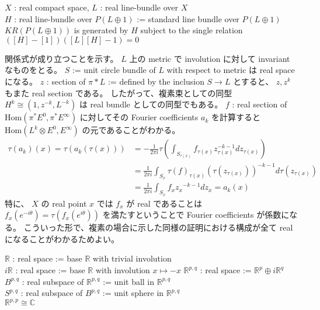 \documentclass[dvipdfmx]{jsarticle}
\begin{document}
\begin{Theorem}
\itemprop
  \For \(X\) : real compact space, \(L\) : real line-bundle over \(X\) \\
  \Let \(H\) : real line-bundle over \(P(L \oplus 1)\) := standard line bundle over \(P(L \oplus 1)\) \\
  \Then \(KR(P(L \oplus 1))\) is generated by \(H\) subject to the single relation \(([H] - [1])([L][H] - 1) = 0\)
\end{Theorem}

\begin{Proof}
\itemprof
  関係式が成り立つことを示す。
  \(L\) 上の metric で involution に対して invariant なものをとる。
  \(S\) := unit circle bundle of \(L\) with respect to metric は real space になる。
  \(z\) : section of \(\pi*L\) := defined by the inclusion \(S \to L\) とすると、 \(z, z^k\) もまた real section である。
  したがって、複素束としての同型 \(H^k \cong (1, z^{-k}, L^{-k})\) は real bundle としての同型でもある。
\itemthen
  \(f\) : real section of \(\text{Hom}(\pi^*{E^0}, \pi^*{E^\infty})\) に対してその Fourier coefficients \(a_{k}\) を計算すると \(\text{Hom}(L^{k} \otimes E^0, E^\infty)\) の元であることがわかる。
  \begin{align*}
    \tau(a_k)(x) = \tau(a_k (\tau(x)))
    &= - \frac{1}{2 \pi i} \tau(\int_{S_{\tau(x)}} f_{\tau(x)} z_{\tau(x)}^{-k - 1} d {z_{\tau(x)}}) \\
    &= \frac{1}{2 \pi i} \int_{S_{x}} \tau(f)_{\tau(x)}(\tau(z_{\tau(x)}))^{-k-1} d {\tau(z_{\tau(x)})} \\
    &= \frac{1}{2 \pi i} \int_{S_{x}} f_{x} {z_{x}}^{-k-1} d z_{x} = a_{k}(x)
  \end{align*}
  特に、 \(X\) の real point \(x\) では \(f_{x}\) が real であることは \(f_{x}(e^{-i\theta}) = \tau(f_{x}(e^{i \theta}))\) を満たすということで Fourier coefficients が係数になる。
  こういった形で、複素の場合に示した同様の証明における構成が全て real になることがわかるためよい。
\end{Proof}

\begin{Definition}
\itemdefi
  \Define \(\mathbb{R}\) : real space := base \(\mathbb{R}\) with trivial involution \\
  \Define \(i\mathbb{R}\) : real space := base \(\mathbb{R}\) with involution \(x \mapsto -x\)
\itemdefi
  \Define \(\mathbb{R}^{p,q}\) : real space := \(\mathbb{R}^{p} \oplus i\mathbb{R}^{q}\) \\
  \Define \(B^{p,q}\) : real subspace of \(\mathbb{R}^{p,q}\) := unit ball in \(\mathbb{R}^{p,q}\) \\
  \Define \(S^{p,q}\) : real subspace of \(B^{p,q}\) := unit sphere in \(\mathbb{R}^{p,q}\) \\
\itemprop
  \Then \(\mathbb{R}^{p,p} \cong \mathbb{C}\)
\end{Definition}
\end{document}
